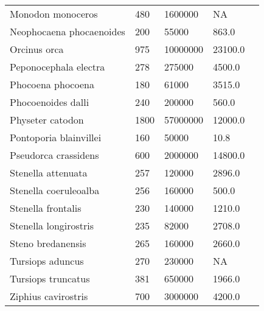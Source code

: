 \begin{longtable}{|p{2.1in}p{0.5in}p{1.0in}p{1.0in}p{1.5in}|}
           Monodon monoceros  &          480 &     1600000  &           NA   &                                \citet{jefferson2008} \\
    Neophocaena phocaenoides  &          200 &       55000  &        863.0   &                                   \citet{kasuya1999} \\
                Orcinus orca  &          975 &    10000000  &      23100.0   &                       \citet{jefferson2008,ross1979} \\
       Peponocephala electra  &          278 &      275000  &       4500.0   &                                \citet{jefferson2008} \\
           Phocoena phocoena  &          180 &       61000  &       3515.0   &                                     \citet{read1999} \\
          Phocoenoides dalli  &          240 &      200000  &        560.0   &                                \citet{jefferson2008} \\
            Physeter catodon  &         1800 &    57000000  &      12000.0   &                                \citet{jefferson2008} \\
      Pontoporia blainvillei  &          160 &       50000  &         10.8   &                                \citet{jefferson2008} \\
        Pseudorca crassidens  &          600 &     2000000  &      14800.0   &                                \citet{jefferson2008} \\
          Stenella attenuata  &          257 &      120000  &       2896.0   &                       \citet{jefferson2008,hohn1985} \\
       Stenella coeruleoalba  &          256 &      160000  &        500.0   &                                 \citet{miyazaki1977} \\
          Stenella frontalis  &          230 &      140000  &       1210.0   &                                   \citet{perrin1994} \\
       Stenella longirostris  &          235 &       82000  &       2708.0   &                                \citet{jefferson2008} \\
           Steno bredanensis  &          265 &      160000  &       2660.0   &                                 \citet{miyazaki1994} \\
            Tursiops aduncus  &          270 &      230000  &           NA   &                                    \citet{wells1999} \\
          Tursiops truncatus  &          381 &      650000  &       1966.0   &                                   \citet{perrin1984} \\
         Ziphius cavirostris  &          700 &     3000000  &       4200.0   &                                    \citet{omura1955} \\
  \hline
\end{longtable}

\normalfont
